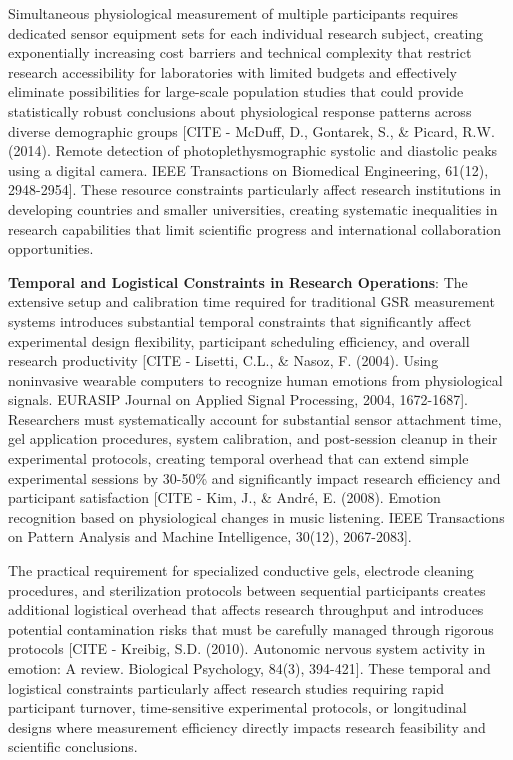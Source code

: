 \documentclass[11pt,a4paper]{report}
\begin{document}
Simultaneous physiological measurement of multiple participants requires dedicated sensor equipment sets for each
individual research subject, creating exponentially increasing cost barriers and technical complexity that restrict
research accessibility for laboratories with limited budgets and effectively eliminate possibilities for large-scale
population studies that could provide statistically robust conclusions about physiological response patterns across
diverse demographic
groups [CITE - McDuff, D., Gontarek, S., \& Picard, R.W. (2014). Remote detection of photoplethysmographic systolic and diastolic peaks using a digital camera. IEEE Transactions on Biomedical Engineering, 61(12), 2948-2954].
These resource constraints particularly affect research institutions in developing countries and smaller universities,
creating systematic inequalities in research capabilities that limit scientific progress and international collaboration
opportunities.

\textbf{Temporal and Logistical Constraints in Research Operations}: The extensive setup and calibration time required for
traditional GSR measurement systems introduces substantial temporal constraints that significantly affect experimental
design flexibility, participant scheduling efficiency, and overall research
productivity [CITE - Lisetti, C.L., \& Nasoz, F. (2004). Using noninvasive wearable computers to recognize human emotions from physiological signals. EURASIP Journal on Applied Signal Processing, 2004, 1672-1687].
Researchers must systematically account for substantial sensor attachment time, gel application procedures, system
calibration, and post-session cleanup in their experimental protocols, creating temporal overhead that can extend simple
experimental sessions by 30-50\% and significantly impact research efficiency and participant
satisfaction [CITE - Kim, J., \& André, E. (2008). Emotion recognition based on physiological changes in music listening. IEEE Transactions on Pattern Analysis and Machine Intelligence, 30(12), 2067-2083].

The practical requirement for specialized conductive gels, electrode cleaning procedures, and sterilization protocols
between sequential participants creates additional logistical overhead that affects research throughput and introduces
potential contamination risks that must be carefully managed through rigorous
protocols [CITE - Kreibig, S.D. (2010). Autonomic nervous system activity in emotion: A review. Biological Psychology, 84(3), 394-421].
These temporal and logistical constraints particularly affect research studies requiring rapid participant turnover,
time-sensitive experimental protocols, or longitudinal designs where measurement efficiency directly impacts research
feasibility and scientific conclusions.
\end{document}
